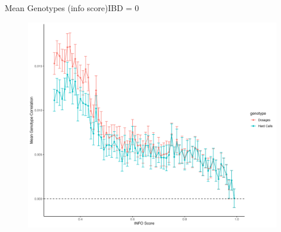 \documentclass{beamer}
\begin{document}





      


\begin{frame}{Mean Genotypes (info score)}{IBD = 0}

\begin{figure}

      \includegraphics[width= .85\textwidth]{fig/mean_gt_by_ibd_0.png}
      
\end{figure}

\end{frame}
\end{document}
